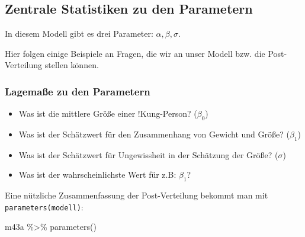 \documentclass[
  a4paper,
  DIV=11]{scrreprt}
\newenvironment{Shaded}{\begin{snugshade}}{\end{snugshade}}
\newcommand{\FunctionTok}[1]{\textcolor[rgb]{0.28,0.35,0.67}{#1}}
\newcommand{\NormalTok}[1]{\textcolor[rgb]{0.00,0.23,0.31}{#1}}
\newcommand{\SpecialCharTok}[1]{\textcolor[rgb]{0.37,0.37,0.37}{#1}}
\providecommand{\tightlist}{%
  \setlength{\itemsep}{0pt}\setlength{\parskip}{0pt}}\usepackage{longtable,booktabs,array}
\theoremstyle{definition}
\theoremstyle{remark}
\begin{document}
\hypertarget{zentrale-statistiken-zu-den-parametern}{%
\subsection{Zentrale Statistiken zu den
Parametern}\label{zentrale-statistiken-zu-den-parametern}}

In diesem Modell gibt es drei Parameter: \(\alpha, \beta, \sigma\).

Hier folgen einige Beispiele an Fragen, die wir an unser Modell bzw. die
Post-Verteilung stellen können.

\hypertarget{lagemauxdfe-zu-den-parametern}{%
\subsubsection{Lagemaße zu den
Parametern}\label{lagemauxdfe-zu-den-parametern}}

\begin{itemize}
\tightlist
\item
  Was ist die mittlere Größe einer !Kung-Person? (\(\beta_0\))
\item
  Was ist der Schätzwert für den Zusammenhang von Gewicht und Größe?
  (\(\beta_1\))
\item
  Was ist der Schätzwert für Ungewissheit in der Schätzung der Größe?
  (\(\sigma\))
\item
  Was ist der wahrscheinlichste Wert für z.B: \(\beta_1\)?
\end{itemize}

Eine nützliche Zusammenfassung der Post-Verteilung bekommt man mit
\texttt{parameters(modell)}:

\begin{Shaded}
\begin{Highlighting}[]
\NormalTok{m43a }\SpecialCharTok{\%\textgreater{}\%} 
  \FunctionTok{parameters}\NormalTok{()}
\end{Highlighting}
\end{Shaded}
\end{document}
